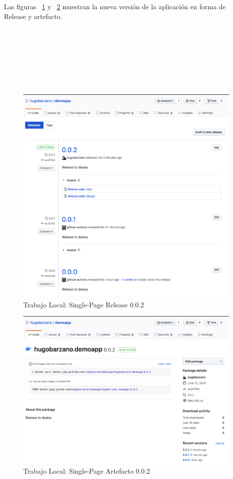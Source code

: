 \documentclass[a4paper,11pt]{book}
\begin{document}
Las figuras ~\ref{3_7} y ~\ref{3_8} muestran la nueva versión de la aplicación en forma de Release y artefacto. 
~\\
~\\
~\\
~\\
~\\
~\\
~\\
~\\
   \begin{figure}[H]
\centering
\includegraphics[scale=0.3]{imagenes/casouso_a/3_7.png}
\caption{  Trabajo Local: Single-Page Release 0.0.2 }
\label{3_7}
\end{figure}

   \begin{figure}[H]
\centering
\includegraphics[scale=0.3]{imagenes/casouso_a/3_8.png}
\caption{ Trabajo Local: Single-Page Artefacto 0.0.2  }
\label{3_8}
\end{figure}
\end{document}
